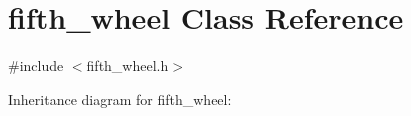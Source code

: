 \hypertarget{classfifth__wheel}{}\section{fifth\+\_\+wheel Class Reference}
\label{classfifth__wheel}


{\ttfamily \#include $<$fifth\+\_\+wheel.\+h$>$}



Inheritance diagram for fifth\+\_\+wheel\+:
